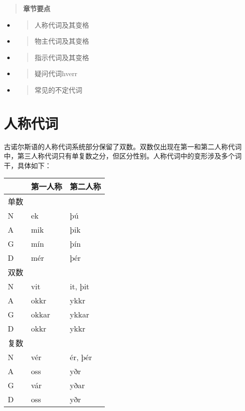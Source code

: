 \begin{quote}
  \textbf{章节要点}
\end{quote}

\begin{itemize}
  \item
        \begin{quote}
          人称代词及其变格
        \end{quote}
  \item
        \begin{quote}
          物主代词及其变格
        \end{quote}
  \item
        \begin{quote}
          指示代词及其变格
        \end{quote}
  \item
        \begin{quote}
          疑问代词hverr
        \end{quote}
  \item
        \begin{quote}
          常见的不定代词
        \end{quote}
\end{itemize}

\section{人称代词}\label{人称代词}

古诺尔斯语的人称代词系统部分保留了双数。双数仅出现在第一和第二人称代词中，第三人称代词只有单复数之分，但区分性别。人称代词中的变形涉及多个词干，具体如下：

\begin{longtable}{lll}
  \toprule
       & 第一人称 & 第二人称 \\
  \midrule
  \endhead
  \bottomrule
  \endfoot
  单数 &          &          \\
  N    & ek       & þú       \\
  A    & mik      & þik      \\
  G    & mín      & þín      \\
  D    & mér      & þér      \\
  双数 &          &          \\
  N    & vit      & it, þit  \\
  A    & okkr     & ykkr     \\
  G    & okkar    & ykkar    \\
  D    & okkr     & ykkr     \\
  复数 &          &          \\
  N    & vér      & ér, þér  \\
  A    & oss      & yðr      \\
  G    & vár      & yðar     \\
  D    & oss      & yðr      \\
\end{longtable}

